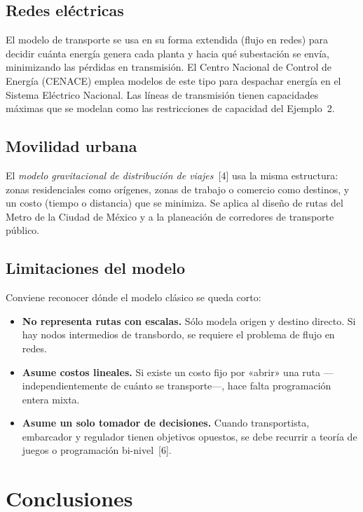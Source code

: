 \documentclass[10pt,letterpaper,twocolumn]{article}
\begin{document}
\subsection{Redes eléctricas}
El modelo de transporte se usa en su forma extendida (flujo en redes) para decidir cuánta energía genera cada planta y hacia qué subestación se envía, minimizando las pérdidas en transmisión. El Centro Nacional de Control de Energía (CENACE) emplea modelos de este tipo para despachar energía en el Sistema Eléctrico Nacional. Las líneas de transmisión tienen capacidades máximas que se modelan como las restricciones de capacidad del Ejemplo~2.

\subsection{Movilidad urbana}
El \emph{modelo gravitacional de distribución de viajes}~[4] usa la misma estructura: zonas residenciales como orígenes, zonas de trabajo o comercio como destinos, y un costo (tiempo o distancia) que se minimiza. Se aplica al diseño de rutas del Metro de la Ciudad de México y a la planeación de corredores de transporte público.

\subsection{Limitaciones del modelo}
Conviene reconocer dónde el modelo clásico se queda corto:

\begin{itemize}
\item \textbf{No representa rutas con escalas.} Sólo modela origen y destino directo. Si hay nodos intermedios de transbordo, se requiere el problema de flujo en redes.
\item \textbf{Asume costos lineales.} Si existe un costo fijo por «abrir» una ruta ---independientemente de cuánto se transporte---, hace falta programación entera mixta.
\item \textbf{Asume un solo tomador de decisiones.} Cuando transportista, embarcador y regulador tienen objetivos opuestos, se debe recurrir a teoría de juegos o programación bi-nivel~[6].
\end{itemize}

\section{Conclusiones}
\end{document}
